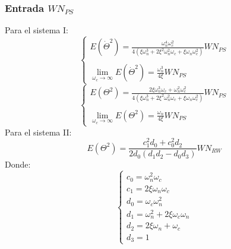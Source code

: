 \documentclass[a4paper,11pt,twoside]{IT-CNEA}
\begin{document}
\subsubsection{Entrada $WN_{PS}$}
Para el sistema I:
\begin{equation}
\begin{cases}
E\left( \dot{\Theta}^2\right)=\frac{\omega_n^4\omega_c^2}{4\left( \xi\omega_n^3+2\xi^2\omega_n^2\omega_c+\xi\omega_n\omega_c^2 \right)}WN_{PS}
\\
\\
\lim_{\omega_c\to\infty}E\left( \dot{\Theta}^2\right)=\frac{\omega_n^3}{4\xi}WN_{PS}
\end{cases}
\label{ec:limiteVelWNPSI}
\end{equation}
\begin{equation}
\begin{cases}
E\left( \Theta^2\right)=\frac{2\xi\omega_n^3\omega_c+\omega_n^2\omega_c^2}{4\left( \xi\omega_n^3+2\xi^2\omega_n^2\omega_c+\xi\omega_n\omega_c^2 \right)}WN_{PS}
\\
\\
\lim_{\omega_c\to\infty}E\left( \Theta^2\right)=\frac{\omega_n}{4\xi}WN_{PS}
\end{cases}
\label{ec:limitePosWNPSI}
\end{equation}
Para el sistema II:
\begin{equation}
E\left( \Theta^2\right)=\frac{c_1^2d_0+c_0^2d_2}{2d_0\left( d_1d_2-d_0d_3\right)} WN_{RW}
\end{equation}
Donde:
\begin{equation}
\begin{cases}
c_0=\omega_n^2\omega_c \\
c_1=2\xi\omega_n\omega_c \\
d_0=\omega_c\omega_n^2 \\
d_1=\omega_n^2+2\xi\omega_c\omega_n \\
d_2=2\xi\omega_n+\omega_c \\
d_3=1
\end{cases}
\end{equation}
\end{document}
